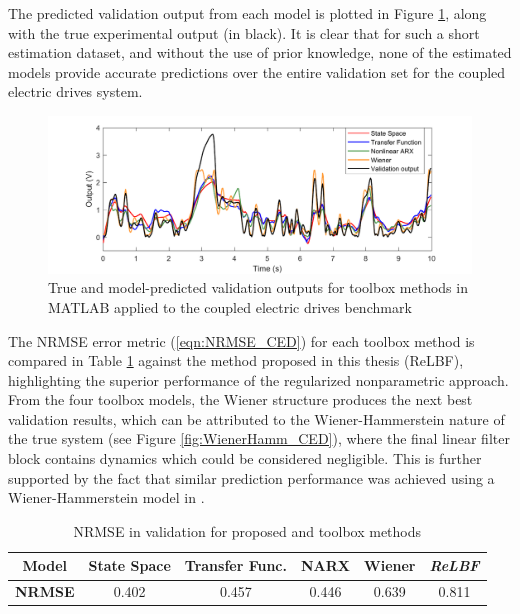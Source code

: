 The predicted validation output from each model is plotted in Figure \ref{fig:ValidationToolbox_CED}, along with the true experimental output (in black). It is clear that for such a short estimation dataset, and without the use of prior knowledge, none of the estimated models provide accurate predictions over the entire validation set for the coupled electric drives system. 

\begin{figure}[h]
\centering
\includegraphics[width=\textwidth]{Chapter6_CaseStudies/ToolboxValidations_CED.pdf}
\caption{True and model-predicted validation outputs for toolbox methods in MATLAB applied to the coupled electric drives benchmark} \label{fig:ValidationToolbox_CED}
\end{figure}

The NRMSE error metric (\ref{eqn:NRMSE_CED}) for each toolbox method is compared in Table \ref{tab:NRMSE_CED} against the method proposed in this thesis (ReLBF), highlighting the superior performance of the regularized nonparametric approach. From the four toolbox models, the Wiener structure produces the next best validation results, which can be attributed to the Wiener-Hammerstein nature of the true system (see Figure \ref{fig:WienerHamm_CED}), where the final linear filter block contains dynamics which could be considered negligible. This is further supported by the fact that similar prediction performance was achieved using a Wiener-Hammerstein model in \cite{Wigren2017}.

\begin{table}[h]
\centering
\caption{NRMSE in validation for proposed and toolbox methods}\label{tab:NRMSE_CED}
\begin{tabular}{|c||c|c|c|c|c|}
\hline
\textbf{Model} & State Space & Transfer Func. & NARX & Wiener &\emph{ReLBF} \\
\hline
\textbf{NRMSE} & 0.402 & 0.457 & 0.446 & 0.639 & 0.811 \\
\hline
\end{tabular}
\end{table}

